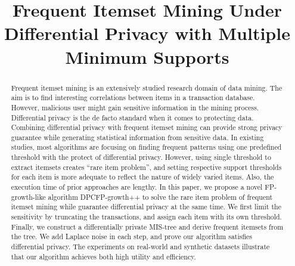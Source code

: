 \documentclass[conference]{IEEEtran}
\begin{document}
\newtheorem{definition}{Definition}
\theoremstyle{definition}
\newtheorem{example}{Example}
\theoremstyle{plain}
\newtheorem{theorem}{Theorem}

\newtheorem{lemma}{Lemma}


\title{Frequent Itemset Mining Under Differential Privacy with Multiple Minimum Supports}

\author{
\and
{}
\and
{}
}

\maketitle

\begin{abstract}
    Frequent itemset mining is an extensively studied research domain of data mining. The aim is to find interesting correlations between items in a transaction database. 
    However, malicious user might gain sensitive information in the mining process. 
    Differential privacy is the de facto standard when it comes to protecting data. 
    Combining differential privacy with frequent itemset mining can provide strong privacy guarantee while generating statistical information from sensitive data. 
    In existing studies, most algorithms are focusing on finding frequent patterns using one predefined threshold with the protect of differential privacy. 
    However, using single threshold to extract itemsets creates ``rare item problem'', and setting respective support thresholds for each item is more adequate to reflect the nature of widely varied items. 
    Also, the execution time of prior approaches are lengthy. 
    In this paper, we propose a novel FP-growth-like algorithm DPCFP-growth++ to solve the rare item problem of frequent itemset mining while guarantee differential privacy at the same time. 
    We first limit the sensitivity by truncating the transactions, and assign each item with its own threshold. 
    Finally, we construct a differentially private MIS-tree and derive frequent itemsets from the tree. 
    We add Laplace noise in each step, and prove our algorithm satisfies differential privacy.
    The experiments on real-world and synthetic datasets illustrate that our algorithm achieves both high utility and efficiency. 
\end{abstract}
\end{document}
